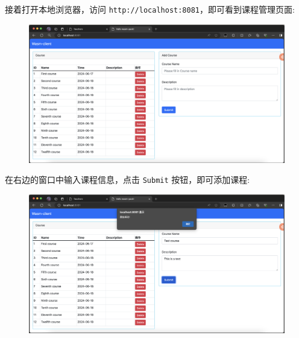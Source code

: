 \documentclass[12pt, oneside]{ctexart}
\numberwithin{figure}{section}
\numberwithin{table}{section}
\begin{document}
接着打开本地浏览器，访问 \texttt{http://localhost:8081}，即可看到课程管理页面:
\begin{figure}[!htbp]
    \centering
    \includegraphics[width=13cm]{images/sec5/Course_Manage_Page.png}
\end{figure}
\newpage
在右边的窗口中输入课程信息，点击 \texttt{Submit} 按钮，即可添加课程:
\begin{figure}[!htbp]
    \centering
    \includegraphics[width=13cm]{images/sec5/Add_Course.png}
\end{figure}
\end{document}

